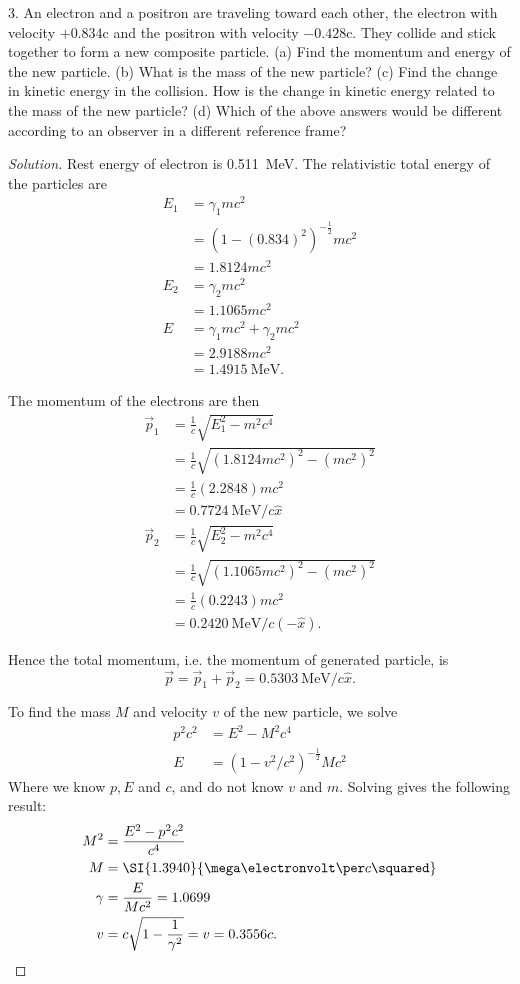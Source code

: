 3. An electron and a positron are traveling toward each other, the electron with velocity $+0.834 \mathrm{c}$ and the positron with velocity $-0.428 \mathrm{c}$. They collide and stick together to form a new composite particle. (a) Find the momentum and energy of the new particle. (b) What is the mass of the new particle? (c) Find the change in kinetic energy in the collision. How is the change in kinetic energy related to the mass of the new particle? (d) Which of the above answers would be different according to an observer in a different reference frame?
\begin{proof}[Solution]
	Rest energy of electron is \SI{0.511}{\mega\electronvolt}.
	The relativistic total energy of the particles are
	\begin{align*}
		E_1 &=  \gamma_1 m c^2 \\
		&=  \left( 1- (0.834)^2\right)^{-\frac{1}{2}} mc^2\\
		&= 1.8124 m c^2 \\
		E_2 &=  \gamma_2 m c^2\\
		&= 1.1065 m c^2  \\
		E &= \gamma_1 m c^2 +\gamma_2 m c^2 \\
		&=  2.9188 m c^2\\
		&= \SI{1.4915}{\mega\electronvolt} 
	.\end{align*}

	The momentum of the electrons are then
	\begin{align*}
		\vec{p} _1  &= \frac{1}{c} \sqrt{E_1^2 - m^2 c^4} \\
		&= \frac{1}{c}\sqrt{\left( 1.8124 m c^2 \right)^2 - (mc^2)^2 }  \\
		&= \frac{1}{c}(2.2848)mc^2 \\
		&= \SI{0.7724}{\mega\electronvolt \per c} \hat{x} \\
		\vec{p} _2 &= \frac{1}{c} \sqrt{E_2^2 - m^2 c^4} \\
		&= \frac{1}{c}\sqrt{\left( 1.1065 m c^2 \right)^2 - (mc^2)^2 }  \\
		&= \frac{1}{c}(0.2243)mc^2 \\
		&= \SI{0.2420}{\mega\electronvolt \per c} (-\hat{x})
	.\end{align*}

	Hence the total momentum, i.e. the momentum of generated particle, is
	\[
		\vec{p}  = \vec{p} _1 + \vec{p} _2 =   \SI{0.5303}{\mega \electronvolt \per c}  \hat{x} 
	.\] 

	To find the mass $M$ and velocity $v$ of the new particle, we solve
	\begin{align*}
		p^2 c^2 &= E^2 - M^2 c^4 \\
		E &= (1- v^2 / c^2)^{-\frac{1}{2}} M c^2
	\end{align*} 
	Where we know $p, E$ and $c$, and do not know $v$ and $m$. Solving gives the following result:
	\begin{align*}
		M^2 &= \frac{E^2 - p^2 c^2}{c^4} \\
		M &= \SI{1.3940}{\mega\electronvolt\per c\squared} \\
		\gamma &= \frac{E}{Mc^2} = 1.0699 \\
		v &= c \sqrt{1 - \frac{1}{\gamma^2}} = v = 0.3556 c
	.\end{align*}



\end{proof}
